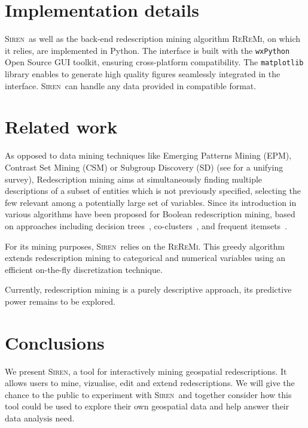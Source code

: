 \documentclass{sig-alternate}
\newcommand{\Siren}{\textsc{Siren}}
\newcommand{\ReReMi}{\textsc{ReReMi}}
\begin{document}
\section{Implementation details}
\Siren\ as well as the back-end redescription mining algorithm \ReReMi, on which it relies, are implemented in Python.
The interface is built with the \texttt{wxPython} Open Source GUI toolkit, ensuring cross-platform compatibility.
The \texttt{matplotlib} library enables to generate high quality figures seamlessly integrated in the interface.
\Siren\ can handle any data provided in compatible format. 

\section{Related work}
\label{sec:related-work}
As opposed to data mining techniques like Emerging Patterns Mining
(EPM), Contrast Set Mining (CSM) or Subgroup Discovery (SD) (see
\cite{kralj09supervised} for a unifying survey), Redescription mining
aims at simultaneously finding multiple descriptions of a subset of
entities which is not previously specified, selecting the few relevant
among a potentially large set of variables. Since its introduction
in~\cite{ramakrishnan04turning} various algorithms have been proposed
for Boolean redescription mining, based on approaches including
decision trees~\cite{ramakrishnan04turning,kumar07redescription},
co-clusters~\cite{parida05redescription}, and frequent
itemsets~\cite{gallo08finding}.  

For its mining purposes, \Siren\
relies on the \ReReMi. This greedy algorithm extends redescription
mining to categorical and numerical variables using an efficient
on-the-fly discretization technique.

Currently, redescription mining is a purely descriptive approach, its
predictive power remains to be explored.

\section{Conclusions}
We present \Siren, a tool for interactively mining geospatial
redescriptions. It allows users to mine, vizualise, edit and extend
redescriptions.
We will give the chance to the public to experiment with \Siren\ and
together consider how this tool could be used to explore their own geospatial
data and help answer their data analysis need.


  

\balancecolumns
\end{document}
